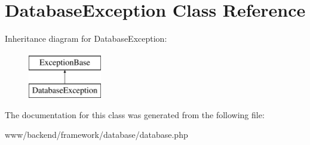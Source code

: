 \hypertarget{classDatabaseException}{
\section{DatabaseException Class Reference}
\label{classDatabaseException}
}
Inheritance diagram for DatabaseException:\begin{figure}[H]
\begin{center}
\leavevmode
\includegraphics[height=2.000000cm]{classDatabaseException}
\end{center}
\end{figure}


The documentation for this class was generated from the following file:\begin{DoxyCompactItemize}
\item 
www/backend/framework/database/database.php\end{DoxyCompactItemize}

